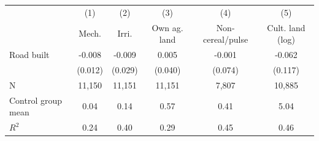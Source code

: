 {
\def\sym#1{\ifmmode^{#1}\else\(^{#1}\)\fi}
\begin{tabular}{l*{5}{c}}
\hline\hline
                         &\multicolumn{1}{c}{(1)}&\multicolumn{1}{c}{(2)}&\multicolumn{1}{c}{(3)}&\multicolumn{1}{c}{(4)}&\multicolumn{1}{c}{(5)}\\
                         &\multicolumn{1}{c}{Mech.}&\multicolumn{1}{c}{Irri.}&\multicolumn{1}{c}{Own ag. land}&\multicolumn{1}{c}{Non-cereal/pulse}&\multicolumn{1}{c}{Cult. land (log)}\\
\hline
Road built               &      -0.008   &      -0.009   &       0.005   &      -0.001   &      -0.062   \\
                         &     (0.012)   &     (0.029)   &     (0.040)   &     (0.074)   &     (0.117)   \\
\hline
N                        &      11,150   &      11,151   &      11,151   &       7,807   &      10,885   \\
Control group mean       &        0.04   &        0.14   &        0.57   &        0.41   &        5.04   \\
$ R^{2} $                &        0.24   &        0.40   &        0.29   &        0.45   &        0.46   \\
\hline\hline
\end{tabular}
}
